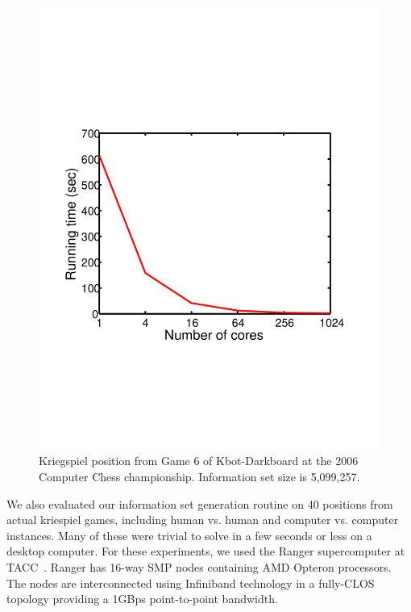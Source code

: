 \documentclass[times, 10pt,twocolumn]{article}
\begin{document}
\begin{figure}[ht]
 \centering \includegraphics[viewport= 280 200 300 550, scale=0.35]{images/KriegspielProblem5.pdf} %

\caption{Kriegspiel position from Game 6 of Kbot-Darkboard at the 2006 Computer
Chess championship.  Information set size is 5,099,257.}

\label{prob5} 
\vspace{-0.2in}
\end{figure}


We also evaluated our information set generation routine on 40 positions from
actual kriespiel games, including human vs. human and computer vs. computer
instances.  Many of these were trivial to solve in a few seconds or less on a
desktop computer.  For these experiments, we used the Ranger supercomputer
at TACC~\cite{ranger}. Ranger has 16-way SMP nodes containing AMD Opteron
processors. The nodes are interconnected using Infiniband technology in a
fully-CLOS topology providing a 1GBps point-to-point bandwidth. 
\end{document}

